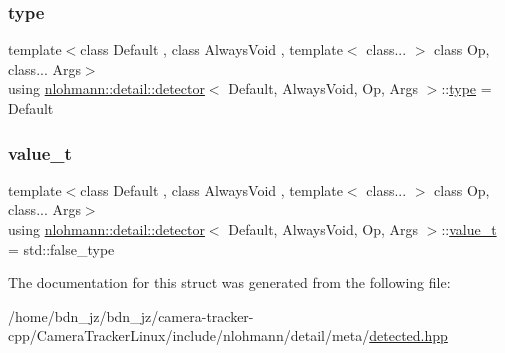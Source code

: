 \subsubsection{\texorpdfstring{type}{type}}
{\footnotesize\ttfamily template$<$class Default , class Always\+Void , template$<$ class... $>$ class Op, class... Args$>$ \\
using \hyperlink{structnlohmann_1_1detail_1_1detector}{nlohmann\+::detail\+::detector}$<$ Default, Always\+Void, Op, Args $>$\+::\hyperlink{structnlohmann_1_1detail_1_1detector_a0cd69423587748bf3d3d702cc7b7c2ce}{type} =  Default}

\mbox{\label{structnlohmann_1_1detail_1_1detector_a5a132aab543d1706e2439268faf8d487}} 
\subsubsection{\texorpdfstring{value\+\_\+t}{value\_t}}
{\footnotesize\ttfamily template$<$class Default , class Always\+Void , template$<$ class... $>$ class Op, class... Args$>$ \\
using \hyperlink{structnlohmann_1_1detail_1_1detector}{nlohmann\+::detail\+::detector}$<$ Default, Always\+Void, Op, Args $>$\+::\hyperlink{structnlohmann_1_1detail_1_1detector_a5a132aab543d1706e2439268faf8d487}{value\+\_\+t} =  std\+::false\+\_\+type}



The documentation for this struct was generated from the following file\+:\begin{DoxyCompactItemize}
\item 
/home/bdn\+\_\+jz/bdn\+\_\+jz/camera-\/tracker-\/cpp/\+Camera\+Tracker\+Linux/include/nlohmann/detail/meta/\hyperlink{detected_8hpp}{detected.\+hpp}\end{DoxyCompactItemize}

